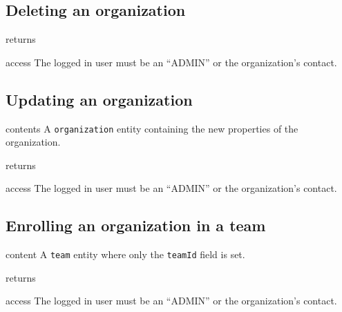 \subsection{Deleting an organization}

\begin{apidata}{returns}
  \begin{datalist}
  \end{datalist}
\end{apidata}
\begin{apidata}{access}
The logged in user must be an ``ADMIN'' or the organization's contact.
\end{apidata}


\subsection{Updating an organization}

\begin{apidata}{contents}
  A \texttt{organization} entity containing the new properties of the
  organization.
\end{apidata}
\begin{apidata}{returns}
  \begin{datalist}
  \end{datalist}
\end{apidata}
\begin{apidata}{access}
The logged in user must be an ``ADMIN'' or the organization's contact.
\end{apidata}


\subsection{Enrolling an organization in a team}

\begin{apidata}{content}
  A \texttt{team} entity where only the \texttt{teamId} field is set.
\end{apidata}
\begin{apidata}{returns}
  \begin{datalist}
  \end{datalist}
\end{apidata}
\begin{apidata}{access}
The logged in user must be an ``ADMIN'' or the organization's contact.
\end{apidata}

